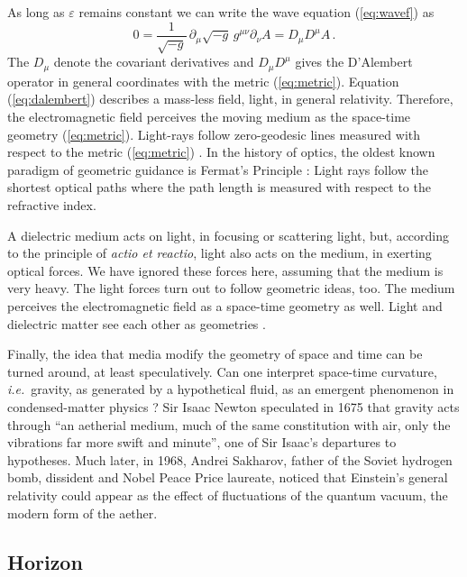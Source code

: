 \documentclass[12pt,amsmath,amssymb]{article}
\numberwithin{equation}{section}
\begin{document}
As long as $\varepsilon$ remains constant we can write the wave equation
(\ref{eq:wavef}) as \cite{LL2}
\begin{equation}
\label{eq:dalembert}
0 = \frac{1}{\sqrt{-g}}\, \partial_\mu \sqrt{-g}\, g^{\mu\nu} \partial_\nu A
= D_\mu D^\mu A \,.
\end{equation}
The $D_\mu$ denote the covariant derivatives and $D_\mu D^\mu$
gives the D'Alembert operator in general coordinates
with the metric (\ref{eq:metric}).
Equation (\ref{eq:dalembert}) describes a mass-less field, light,
in general relativity. Therefore,
the electromagnetic field perceives the moving medium as the
space-time geometry (\ref{eq:metric}).
Light-rays follow zero-geodesic lines measured with respect to the metric
(\ref{eq:metric}) \cite{LeoPiwstor}.
In the history of optics, the oldest known paradigm of geometric guidance
is Fermat's Principle \cite{BornWolf}:
Light rays follow the shortest optical paths where the path length
is measured with respect to the refractive index.

A dielectric medium acts on light, in focusing or scattering light,
but, according to the principle of
{\it actio et reactio}, light also acts on the medium,
in exerting optical forces.
We have ignored these forces here,
assuming that the medium is very heavy.
The light forces turn out to follow geometric ideas, too.
The medium perceives the electromagnetic field as a space-time
geometry as well. Light and dielectric matter see each other
as geometries \cite{LeoSpace}.

Finally, the idea that media modify the geometry of space and time
can be turned around, at least speculatively.
Can one interpret space-time curvature, {\it i.e.}\ gravity,
as generated by a hypothetical fluid, as an emergent phenomenon
in condensed-matter physics \cite{VolovikBook}?
Sir Isaac Newton speculated
in 1675 \cite{Brewster}
that gravity acts through ``an aetherial medium,
much of the same constitution with air, only the vibrations
far more swift and minute'', one of Sir Isaac's departures to
hypotheses. Much later, in 1968, Andrei Sakharov,
father of the Soviet hydrogen bomb, dissident and Nobel
Peace Price laureate, noticed \cite{Sacharov}
that Einstein's general relativity
could appear as the effect of fluctuations of the quantum
vacuum, the modern form of the aether.

\subsection{Horizon}
\end{document}
